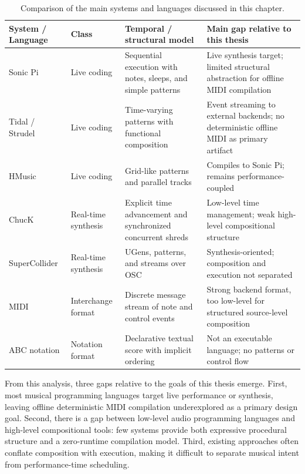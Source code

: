 \begin{table}[htbp]
  \centering
  \footnotesize
  \renewcommand{\arraystretch}{1.5}
  \begin{tabular}{p{2.2cm}p{2.5cm}p{4cm}p{5cm}}
    \toprule
    \textbf{System / Language} & \textbf{Class} & \textbf{Temporal / structural model} & \textbf{Main gap
    relative to this thesis} \\
    \midrule
    Sonic Pi & Live coding & Sequential execution with notes, sleeps, and simple patterns &
    Live synthesis target; limited structural abstraction for offline MIDI compilation \\
    Tidal / Strudel & Live coding & Time-varying patterns with functional composition &
    Event streaming to external backends; no deterministic offline MIDI as primary artifact \\
    HMusic & Live coding & Grid-like patterns and parallel tracks & Compiles to Sonic Pi; remains performance-coupled \\
    ChucK & Real-time synthesis & Explicit time advancement and synchronized concurrent shreds &
    Low-level time management; weak high-level compositional structure \\
    Super\-Collider & Real-time synthesis & UGens, patterns, and streams over OSC &
    Synthesis-oriented; composition and execution not separated \\
    MIDI & Interchange format & Discrete message stream of note and control events &
    Strong backend format, too low-level for structured source-level composition \\
    ABC notation & Notation format & Declarative textual score with implicit ordering &
    Not an executable language; no patterns or control flow \\
    \bottomrule
  \end{tabular}
  \caption{Comparison of the main systems and languages discussed in this
  chapter.}\label{tab:related-work-comparison}
\end{table}

From this analysis, three gaps relative to the goals of this thesis emerge.
First, most musical programming languages target live performance or synthesis, leaving offline deterministic MIDI
compilation underexplored as a primary design goal.
Second, there is a gap between low-level audio programming languages and high-level compositional tools: few systems
provide both expressive procedural structure and a zero-runtime compilation model.
Third, existing approaches often conflate composition with execution, making it difficult to separate musical intent
from performance-time scheduling.


